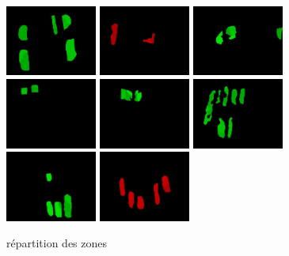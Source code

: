 \documentclass[a4paper,10pt]{report}
\begin{document}
\begin{figure}[htbp]
  \caption{répartition des zones}
  \centering
  \includegraphics[width=3cm]{piece(1).jpg}
  \includegraphics[width=3cm]{piece(2).jpg}
  \includegraphics[width=3cm]{piece(3).jpg}
  \includegraphics[width=3cm]{piece(4).jpg}
  \includegraphics[width=3cm]{piece(5).jpg}
  \includegraphics[width=3cm]{piece(6).jpg}
  \includegraphics[width=3cm]{piece(7).jpg}
  \includegraphics[width=3cm]{piece(8).jpg}

\end{figure}
\end{document}
